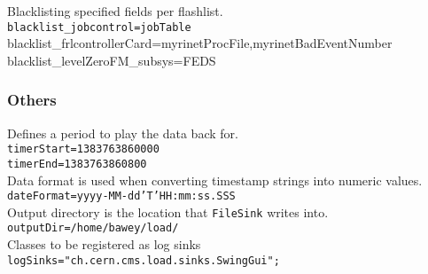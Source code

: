 Blacklisting specified fields per flashlist.\\
\texttt{blacklist\_jobcontrol=jobTable}
blacklist\_frlcontrollerCard=myrinetProcFile,myrinetBadEventNumber
blacklist\_levelZeroFM\_subsys=FEDS


\subsubsection{Others}
Defines a period to play the data back for. \\
\texttt{timerStart=1383763860000} \\
\texttt{timerEnd=1383763860800} \\

Data format is used when converting timestamp strings into numeric values. \\
\texttt{dateFormat=yyyy-MM-dd'T'HH:mm:ss.SSS} \\

Output directory is the location that \texttt{FileSink} writes into. \\
\texttt{outputDir=/home/bawey/load/} \\

Classes to be registered as log sinks
\texttt{logSinks="ch.cern.cms.load.sinks.SwingGui";}

